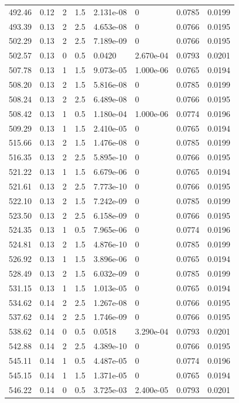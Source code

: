 \documentclass[preview]{standalone}
\begin{document}
{{{{\begin{tabular}{L{1.2cm}C{1.2cm} C{0.3cm}C{0.5cm} C{1.4cm}C{1.4cm} C{1.4cm}C{1.4cm}}
  492.46  &  0.12  & 2     & 1.5 &  2.131e-08  & 0  & 0.0785 &  0.0199   \\ 
  493.39  &  0.13  & 2     & 2.5 &  4.653e-08  & 0  & 0.0766 &  0.0195   \\ 
  502.29  &  0.13  & 2     & 2.5 &  7.189e-09  & 0  & 0.0766 &  0.0195   \\ 
  502.57  &  0.13  & 0     & 0.5 &  0.0420  & 2.670e-04  & 0.0793 &  0.0201   \\ 
  507.78  &  0.13  & 1     & 1.5 &  9.073e-05  & 1.000e-06  & 0.0765 &  0.0194   \\ 
  508.20  &  0.13  & 2     & 1.5 &  5.816e-08  & 0  & 0.0785 &  0.0199   \\ 
  508.24  &  0.13  & 2     & 2.5 &  6.489e-08  & 0  & 0.0766 &  0.0195   \\ 
  508.42  &  0.13  & 1     & 0.5 &  1.180e-04  & 1.000e-06  & 0.0774 &  0.0196   \\ 
  509.29  &  0.13  & 1     & 1.5 &  2.410e-05  & 0  & 0.0765 &  0.0194   \\ 
  515.66  &  0.13  & 2     & 1.5 &  1.476e-08  & 0  & 0.0785 &  0.0199   \\ 
  516.35  &  0.13  & 2     & 2.5 &  5.895e-10  & 0  & 0.0766 &  0.0195   \\ 
  521.22  &  0.13  & 1     & 1.5 &  6.679e-06  & 0  & 0.0765 &  0.0194   \\ 
  521.61  &  0.13  & 2     & 2.5 &  7.773e-10  & 0  & 0.0766 &  0.0195   \\ 
  522.10  &  0.13  & 2     & 1.5 &  7.242e-09  & 0  & 0.0785 &  0.0199   \\ 
  523.50  &  0.13  & 2     & 2.5 &  6.158e-09  & 0  & 0.0766 &  0.0195   \\ 
  524.35  &  0.13  & 1     & 0.5 &  7.965e-06  & 0  & 0.0774 &  0.0196   \\ 
  524.81  &  0.13  & 2     & 1.5 &  4.876e-10  & 0  & 0.0785 &  0.0199   \\ 
  526.92  &  0.13  & 1     & 1.5 &  3.896e-06  & 0  & 0.0765 &  0.0194   \\ 
  528.49  &  0.13  & 2     & 1.5 &  6.032e-09  & 0  & 0.0785 &  0.0199   \\ 
  531.15  &  0.13  & 1     & 1.5 &  1.013e-05  & 0  & 0.0765 &  0.0194   \\ 
  534.62  &  0.14  & 2     & 2.5 &  1.267e-08  & 0  & 0.0766 &  0.0195   \\ 
  537.62  &  0.14  & 2     & 2.5 &  1.746e-09  & 0  & 0.0766 &  0.0195   \\ 
  538.62  &  0.14  & 0     & 0.5 &  0.0518  & 3.290e-04  & 0.0793 &  0.0201   \\ 
  542.88  &  0.14  & 2     & 2.5 &  4.389e-10  & 0  & 0.0766 &  0.0195   \\ 
  545.11  &  0.14  & 1     & 0.5 &  4.487e-05  & 0  & 0.0774 &  0.0196   \\ 
  545.15  &  0.14  & 1     & 1.5 &  1.371e-05  & 0  & 0.0765 &  0.0194   \\ 
  546.22  &  0.14  & 0     & 0.5 &  3.725e-03  & 2.400e-05  & 0.0793 &  0.0201   \\ 
\hline 
\end{tabular} 

}}}}
\end{document}
